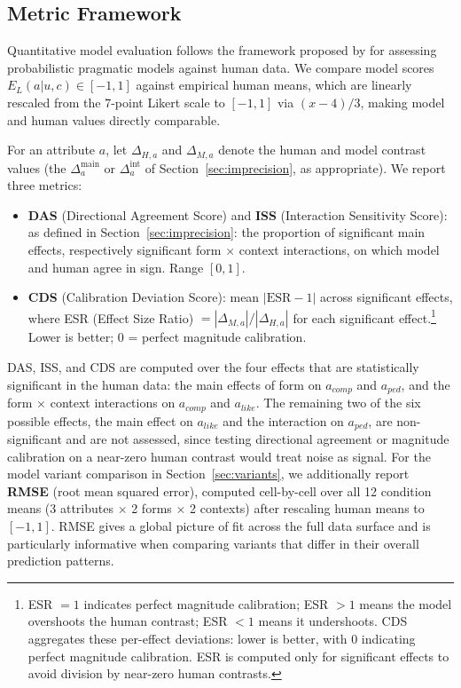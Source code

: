 \documentclass[12pt,a4paper]{article}
\begin{document}
\subsection{Metric Framework}
\label{sec:metrics}

Quantitative model evaluation follows the framework proposed by
\citet{muehlenbernd2026} for assessing probabilistic pragmatic models against
human data. We compare model scores $E_L(a|u,c) \in [-1,1]$ against empirical
human means, which are linearly rescaled from the 7-point Likert scale to
$[-1,1]$ via $(x-4)/3$, making model and human values directly comparable.

For an attribute $a$, let $\Delta_{H,a}$ and $\Delta_{M,a}$ denote the human
and model contrast values (the $\Delta^{\text{main}}_a$ or $\Delta^{\text{int}}_a$
of Section~\ref{sec:imprecision}, as appropriate). We report three metrics:

\begin{itemize}
\item \textbf{DAS} (Directional Agreement Score) and \textbf{ISS} (Interaction
Sensitivity Score): as defined in Section~\ref{sec:imprecision}: the proportion
of significant main effects, respectively significant form $\times$ context
interactions, on which model and human agree in sign. Range $[0,1]$.

\item \textbf{CDS} (Calibration Deviation Score): mean $|\text{ESR} - 1|$ across
significant effects, where ESR (Effect Size Ratio) $= |\Delta_{M,a}| /
|\Delta_{H,a}|$ for each significant effect.\footnote{ESR $= 1$ indicates
perfect magnitude calibration; ESR $> 1$ means the model overshoots the human
contrast; ESR $< 1$ means it undershoots. CDS aggregates these per-effect
deviations: lower is better, with $0$ indicating perfect magnitude calibration.
ESR is computed only for significant effects to avoid division by near-zero
human contrasts.} Lower is better; $0$ = perfect magnitude calibration.
\end{itemize}

DAS, ISS, and CDS are computed over the four effects that are statistically
significant in the human data: the main effects of form on $a_{comp}$ and
$a_{ped}$, and the form $\times$ context interactions on $a_{comp}$ and
$a_{like}$. The remaining two of the six possible effects, the main effect on
$a_{like}$ and the interaction on $a_{ped}$, are non-significant and are not
assessed, since testing directional agreement or magnitude calibration on a
near-zero human contrast would treat noise as signal. For the model variant
comparison in Section~\ref{sec:variants}, we additionally report \textbf{RMSE}
(root mean squared error), computed cell-by-cell over all 12 condition means
(3 attributes $\times$ 2 forms $\times$ 2 contexts) after rescaling human means
to $[-1,1]$. RMSE gives a global picture of fit across the full data surface
and is particularly informative when comparing variants that differ in their
overall prediction patterns.
\end{document}
